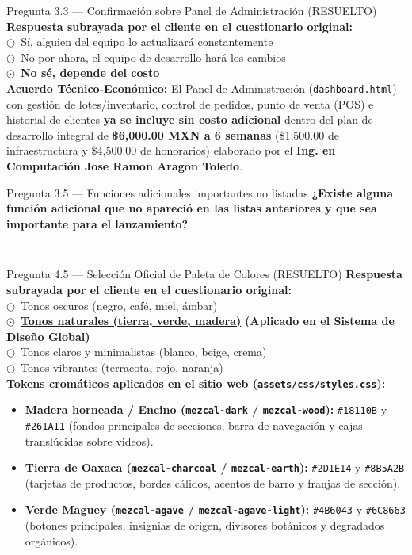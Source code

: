 \documentclass[11pt,letterpaper]{article}
\newcommand{\uradio}{$\bigcirc$}
\newcommand{\radio}{\textcolor{mezcalAgave}{\textbf{$\odot$}}}
\newcommand{\fillline}[1][1.0\linewidth]{%
    \par\vspace{0.35em}\noindent\textcolor{gray!70}{\rule{#1}{0.5pt}}\par\vspace{0.25em}%
}
\begin{document}
\begin{pendingbox}{Pregunta 3.3 — Confirmación sobre Panel de Administración (RESUELTO)}
\textbf{Respuesta subrayada por el cliente en el cuestionario original:}\\[0.4em]
\uradio\ Sí, alguien del equipo lo actualizará constantemente\\[0.25em]
\uradio\ No por ahora, el equipo de desarrollo hará los cambios\\[0.25em]
\radio\ \underline{\textbf{No sé, depende del costo}}\\[0.35em]
\textbf{Acuerdo Técnico-Económico:} El Panel de Administración (\texttt{dashboard.html}) con gestión de lotes/inventario, control de pedidos, punto de venta (POS) e historial de clientes \textbf{ya se incluye sin costo adicional} dentro del plan de desarrollo integral de \textbf{\$6,000.00 MXN a 6 semanas} (\$1,500.00 de infraestructura y \$4,500.00 de honorarios) elaborado por el \textbf{Ing. en Computación Jose Ramon Aragon Toledo}.
\end{pendingbox}

\begin{pendingbox}{Pregunta 3.5 — Funciones adicionales importantes no listadas}
\textbf{¿Existe alguna función adicional que no apareció en las listas anteriores y que sea importante para el lanzamiento?}
\fillline
\fillline
\end{pendingbox}

\begin{pendingbox}{Pregunta 4.5 — Selección Oficial de Paleta de Colores (RESUELTO)}
\textbf{Respuesta subrayada por el cliente en el cuestionario original:}\\[0.4em]
\uradio\ Tonos oscuros (negro, café, miel, ámbar)\\[0.2em]
\radio\ \underline{\textbf{Tonos naturales (tierra, verde, madera)}} \quad \textcolor{mezcalAgave}{\textbf{(Aplicado en el Sistema de Diseño Global)}}\\[0.2em]
\uradio\ Tonos claros y minimalistas (blanco, beige, crema)\\[0.2em]
\uradio\ Tonos vibrantes (terracota, rojo, naranja)\\[0.4em]
\textbf{Tokens cromáticos aplicados en el sitio web (\texttt{assets/css/styles.css}):}
\begin{itemize}[leftmargin=1.5em, topsep=2pt, itemsep=1pt]
    \item \textbf{Madera horneada / Encino (\texttt{mezcal-dark} / \texttt{mezcal-wood}):} \texttt{\#18110B} y \texttt{\#261A11} (fondos principales de secciones, barra de navegación y cajas translúcidas sobre videos).
    \item \textbf{Tierra de Oaxaca (\texttt{mezcal-charcoal} / \texttt{mezcal-earth}):} \texttt{\#2D1E14} y \texttt{\#8B5A2B} (tarjetas de productos, bordes cálidos, acentos de barro y franjas de sección).
    \item \textbf{Verde Maguey (\texttt{mezcal-agave} / \texttt{mezcal-agave-light}):} \texttt{\#4B6043} y \texttt{\#6C8663} (botones principales, insignias de origen, divisores botánicos y degradados orgánicos).
\end{itemize}
\end{pendingbox}
\end{document}
